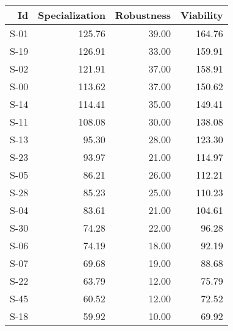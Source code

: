 

\begin{tabular}{ | r | r | r | r | }
    \hline
                    Id  &  Specialization  &      Robustness  &       Viability  \\
    \hline
    \hline
                  S-01  &          125.76  &           39.00  &          164.76  \\
    \hline
                  S-19  &          126.91  &           33.00  &          159.91  \\
    \hline
                  S-02  &          121.91  &           37.00  &          158.91  \\
    \hline
                  S-00  &          113.62  &           37.00  &          150.62  \\
    \hline
                  S-14  &          114.41  &           35.00  &          149.41  \\
    \hline
                  S-11  &          108.08  &           30.00  &          138.08  \\
    \hline
                  S-13  &           95.30  &           28.00  &          123.30  \\
    \hline
                  S-23  &           93.97  &           21.00  &          114.97  \\
    \hline
                  S-05  &           86.21  &           26.00  &          112.21  \\
    \hline
                  S-28  &           85.23  &           25.00  &          110.23  \\
    \hline
                  S-04  &           83.61  &           21.00  &          104.61  \\
    \hline
                  S-30  &           74.28  &           22.00  &           96.28  \\
    \hline
                  S-06  &           74.19  &           18.00  &           92.19  \\
    \hline
                  S-07  &           69.68  &           19.00  &           88.68  \\
    \hline
                  S-22  &           63.79  &           12.00  &           75.79  \\
    \hline
                  S-45  &           60.52  &           12.00  &           72.52  \\
    \hline
                  S-18  &           59.92  &           10.00  &           69.92  \\

\end{tabular}
